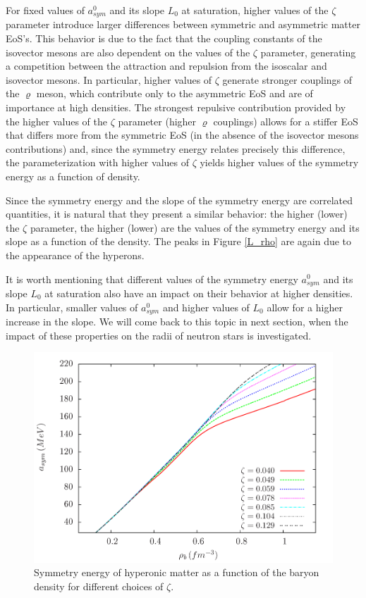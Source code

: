 \documentclass[twocolumn,showpacs,aps]{revtex4}
\begin{document}
 For fixed values of $a^0_{sym}$ and its slope $L_0$ at saturation, higher values of the $\zeta$ parameter introduce larger differences between symmetric and 
 asymmetric matter EoS's. 
 This behavior is due to the fact that the coupling constants of the isovector mesons are also dependent on the values of the $\zeta$ parameter, generating a competition
 between the attraction and repulsion from the isoscalar and isovector mesons.
 In particular, higher values of $\zeta$ generate stronger couplings of the $\varrho$ meson, which contribute only to the asymmetric EoS
 and are of importance at high densities.
 The strongest repulsive contribution provided by the higher values of the $\zeta$ parameter (higher $\varrho$ couplings) allows for a stiffer EoS that differs more from the 
 symmetric EoS (in the absence of the isovector mesons contributions) and, since the symmetry energy relates precisely this difference, the parameterization with higher 
 values of $\zeta$ yields higher values of the symmetry energy as a function of density.
 
 Since the symmetry energy and the slope of the symmetry energy are correlated quantities, 
 it is natural that they present a similar behavior:
 the higher (lower) the $\zeta$ parameter, the higher (lower) are the values of the symmetry energy and its slope as a function of the density.
 The peaks in Figure \ref{L_rho} are again due to the appearance of the hyperons.
 
 It is worth mentioning that different values of the symmetry energy $a_{sym}^0$ and its slope $L_0$ at saturation also have 
 an impact on their behavior at higher densities. In particular, smaller values of $a_{sym}^0$ and higher values of 
 $L_0$ allow for a higher increase in the slope. We will come back to this topic in next section,
 when the impact of these properties on the radii of neutron stars is investigated. 
 
 \begin{figure}
 \centering
 \vspace{1.0cm}
 \includegraphics[width=9.cm]{asym_rho_paper.png}
 \caption{\label{asym_rho} Symmetry energy of hyperonic matter as a function of the baryon density for different choices of $\zeta$.}
 \end{figure}
 
\end{document}
